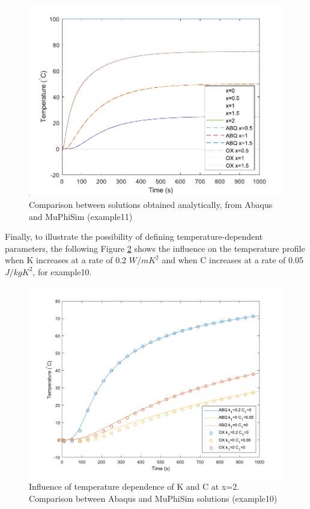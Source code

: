 \documentclass[oneside,11pt,times]{book}
\begin{document}
\begin{figure}[H]
    \centering
    \includegraphics[width=0.6\linewidth]{imgs/Examples/Comparison-ex11.pdf}
    \caption{Comparison between solutions obtained analytically, from Abaqus and MuPhiSim (example11)}
    \label{fig:ex11Comparison}
\end{figure}
Finally, to illustrate the possibility of defining temperature-dependent parameters, the following Figure \ref{fig:ex10-2Comparison} shows the influence on the temperature profile when K increases at a rate of 0.2 $W/mK^2$ and when C increases at a rate of 0.05 $J/kgK^2$, for example10.

\begin{figure}[h!]
    \centering
    \includegraphics[width=0.6\linewidth]{imgs/Examples/Comparison-ex10-2.pdf}
    \caption{Influence of temperature dependence of K and C at x=2. Comparison between Abaqus and MuPhiSim solutions (example10)}
    \label{fig:ex10-2Comparison}
\end{figure}
\newpage
\end{document}
